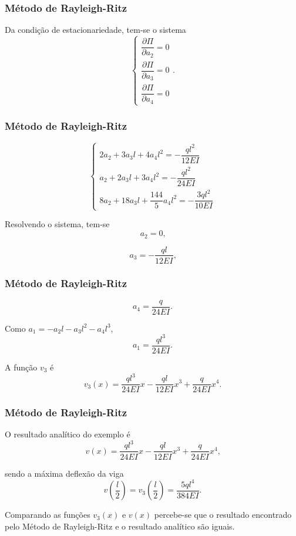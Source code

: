 \documentclass{beamer}
\newif\ifcompilepause
\newcommand{\cpause}{
	\ifcompilepause
	\pause
	\fi
}
\begin{document}
	\begin{frame}
		\frametitle{Método de Rayleigh-Ritz}
		\justify
		Da condição de estacionariedade, tem-se o sistema
		$$
			\begin{cases}
				\dfrac{\partial \Pi}{\partial a_2}=0\\[10pt]
				\dfrac{\partial \Pi}{\partial a_3}=0\\[10pt]
				\dfrac{\partial \Pi}{\partial a_4}=0
			\end{cases}
			\text{.}
		$$
	\end{frame}
	
	\begin{frame}
		\frametitle{Método de Rayleigh-Ritz}
		\justify
		
		$$
			\begin{cases}
				2a_2 + 3a_3l + 4a_4l^2 = -\dfrac{ql^2}{12EI}\\[10pt]
				a_2 + 2a_3 l + 3a_4 l^2 = - \dfrac{ql^2}{24EI}\\[10pt]
				8a_2 + 18a_3 l + \dfrac{144}{5} a_4 l^2 =-\dfrac{3ql^2}{10EI}
			\end{cases}
		$$
		\cpause
		Resolvendo o sistema, tem-se
		$$
			a_2 = 0
			\text{,}
		$$
		\cpause
		$$
			a_3 = -\frac{ql}{12EI}
			\text{,}
		$$
	\end{frame}
	
	\begin{frame}
		\frametitle{Método de Rayleigh-Ritz}
		\justify
	
		$$
			a_4 = \frac{q}{24EI}
			\text{.}
		$$
		\cpause
		Como $a_1=-a_2l - a_3l^2-a_4l^3$,
		$$
			a_1 = \frac{ql^3}{24EI}
			\text{.}
		$$
		\cpause
		A função $v_3$ é
		$$
			v_3(x)=
			\frac{ql^3}{24EI} x
			-
			\frac{ql}{12EI} x^3
			+
			\frac{q}{24EI} x^4
			\text{.}
		$$
	\end{frame}
	
	\begin{frame}
		\frametitle{Método de Rayleigh-Ritz}
		\justify
		
		O resultado analítico do exemplo é
		$$
			v(x)=\frac{ql^3}{24EI}x - \frac{ql}{12EI}x^3 + \frac{q}{24EI}x^4
			\text{,}
		$$
		\cpause
		sendo a máxima deflexão da viga
		$$
			v\left (\frac{l}{2}\right )
			=
			v_3\left (\frac{l}{2}\right )
			= \frac{5ql^4}{384EI}
			\text{.}
		$$
		\cpause
		
		Comparando as funções $v_3(x)$ e $v(x)$ percebe-se que o resultado encontrado pelo Método de Rayleigh-Ritz e o resultado analítico são iguais.
	\end{frame}
	
\end{document}
